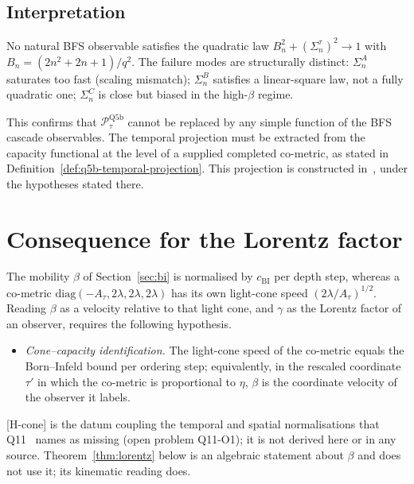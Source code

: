 \documentclass[11pt]{article}
\begin{document}
  \subsection{Interpretation}

  No natural BFS observable satisfies the quadratic law $B_n^2+(\Sigma_n^\tau)^2
  \to 1$ with $B_n = (2n^2+2n+1)/q^2$.
  The failure modes are structurally distinct:
  $\Sigma_n^A$ saturates too fast (scaling mismatch);
  $\Sigma_n^B$ satisfies a linear-square law, not a fully quadratic one;
  $\Sigma_n^C$ is close but biased in the high-$\beta$ regime.

  This confirms that $\mathcal{P}_\tau^{\mathrm{Q5b}}$ cannot be replaced by
  any simple function of the BFS cascade observables.
  The temporal projection must be extracted from the capacity functional at the
  level of a supplied completed co-metric, as stated in
  Definition~\ref{def:q5b-temporal-projection}.
  This projection is constructed in~\cite{Beau2026tp}, under the hypotheses stated there.

  \section{Consequence for the Lorentz factor}
  \label{sec:consequence}

  The mobility $\beta$ of Section~\ref{sec:bi} is normalised by $c_{\mathrm{BI}}$ per depth step, whereas a
  co-metric $\mathrm{diag}(-A_\tau, 2\lambda, 2\lambda, 2\lambda)$ has its own light-cone speed
  $(2\lambda/A_\tau)^{1/2}$.
  Reading $\beta$ as a velocity relative to that light cone, and $\gamma$ as the Lorentz factor of an observer,
  requires the following hypothesis.
  \begin{itemize}
    \item[{[H-cone]}] \emph{Cone--capacity identification.}
    The light-cone speed of the co-metric equals the Born--Infeld bound per ordering step; equivalently, in the
    rescaled coordinate $\tau'$ in which the co-metric is proportional to $\eta$, $\beta$ is the coordinate
    velocity of the observer it labels.
  \end{itemize}
  [H-cone] is the datum coupling the temporal and spatial normalisations that Q11~\cite{Beau2026q11} names as
  missing (open problem Q11-O1); it is not derived here or in any source.
  Theorem~\ref{thm:lorentz} below is an algebraic statement about $\beta$ and does not use it; its kinematic
  reading does.
\end{document}
